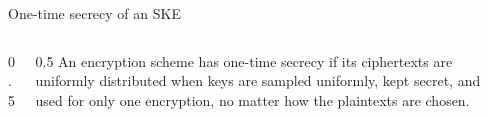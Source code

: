 \ifdefined\PRESENTATION\else\PassOptionsToClass{handout}{beamer}\fi\documentclass[aspectratio=169, lualatex]{beamer}
\begin{document}
\begin{frame}{One-time secrecy of an SKE}
	\begin{columns}[c]
		\begin{column}{0.5\textwidth}
		\end{column}
		\begin{column}{0.5\textwidth}
			An encryption scheme has one-time secrecy if its ciphertexts are uniformly distributed when keys are sampled uniformly, kept secret, and used for only one encryption, no matter how the plaintexts are chosen.
		\end{column}
	\end{columns}
\end{frame}
\end{document}
